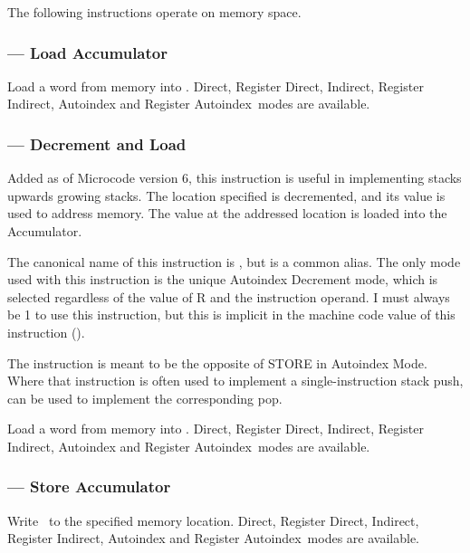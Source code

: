 The following instructions operate on memory space.

\newcommand\AMGroupOne{Direct, Register Direct, Indirect, Register Indirect,
  Autoindex and Register Autoindex\ }

\newcommand\AMGroupTwo{Address, Register Address, Indirect Address, Register
  Indirect Address, Autoindex Address, and Register Autoindex Address\ }

\subsubsection{ — Load Accumulator}
\label{sec:instruction-LOAD}

Load a word from memory into \A. \AMGroupOne modes are available.

\subsubsection{ — Decrement and Load}

Added as of Microcode version 6, this instruction is useful in implementing
stacks upwards growing stacks. The location specified is decremented, and its
value is used to address memory. The value at the addressed location is loaded
into the Accumulator.

The canonical name of this instruction is , but  is a common
alias. The only mode used with this instruction is the unique Autoindex
Decrement mode, which is selected regardless of the value of R and the
instruction operand. I must always be 1 to use this instruction, but this is
implicit in the machine code value of this instruction ().

The instruction is meant to be the opposite of {\asm STORE} in Autoindex
Mode. Where that instruction is often used to implement a single-instruction
stack push,  can be used to implement the corresponding pop.

\label{sec:instruction-LOAD}

Load a word from memory into \A. \AMGroupOne modes are available.

\subsubsection{ — Store Accumulator}
\label{sec:instruction-STORE}

Write \A\ to the specified memory location. \AMGroupOne modes are available.

